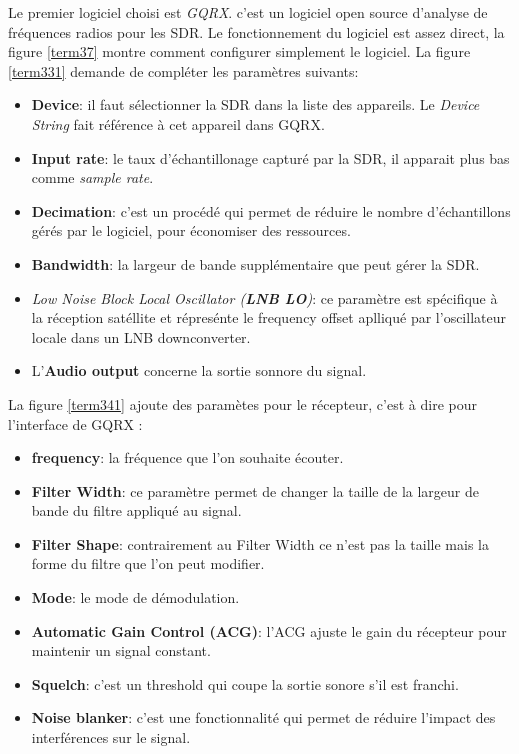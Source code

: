 Le premier logiciel choisi est \textit{GQRX}. c'est un logiciel open source d'analyse de fréquences radios pour les SDR. Le fonctionnement du logiciel est assez direct, la figure \ref{term37} montre comment configurer simplement le logiciel. La figure \ref{term331} demande de compléter les paramètres suivants:

\vspace{0.1cm}

\begin{itemize}
\item \textbf{Device}: il faut sélectionner la SDR dans la liste des appareils. Le \textit{Device String} fait référence à cet appareil dans GQRX.
\item \textbf{Input rate}: le taux d'échantillonage capturé par la SDR, il apparait plus bas comme \textit{sample rate}.
\item \textbf{Decimation}: c'est un procédé qui permet de réduire le nombre d'échantillons gérés par le logiciel, pour économiser des ressources.
\item \textbf{Bandwidth}: la largeur de bande supplémentaire que peut gérer la SDR.
\item \textit{Low Noise Block Local Oscillator (\textbf{LNB LO})}: ce paramètre est spécifique à la réception satéllite et répresénte le frequency offset aplliqué par l'oscillateur locale dans un LNB downconverter.
\item L'\textbf{Audio output} concerne la sortie sonnore du signal.
\end{itemize}

\vspace{0.1cm}

La figure \ref{term341} ajoute des paramètes pour le récepteur, c'est à dire pour l'interface de GQRX :

\vspace{0.1cm}

\begin{itemize}
\item \textbf{frequency}: la fréquence que l'on souhaite écouter.
\item \textbf{Filter Width}: ce paramètre permet de changer la taille de la largeur de bande du filtre appliqué au signal.
\item \textbf{Filter Shape}: contrairement au Filter Width ce n'est pas la taille mais la forme du filtre que l'on peut modifier.
\item \textbf{Mode}: le mode de démodulation.
\item \textbf{Automatic Gain Control (ACG)}: l'ACG ajuste le gain du récepteur pour maintenir un signal constant.
\item \textbf{Squelch}: c'est un threshold qui coupe la sortie sonore s'il est franchi.
\item \textbf{Noise blanker}: c'est une fonctionnalité qui permet de réduire l'impact des interférences sur le signal.
\end{itemize}

